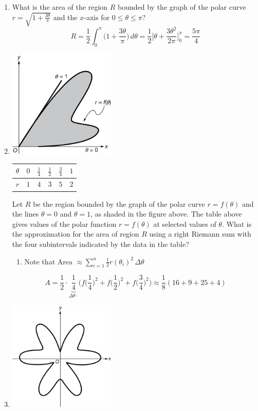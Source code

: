 \documentclass[12pt]{article}
\begin{document}
\begin{enumerate}
	\item What is the area of the region $R$ bounded by the graph of the polar curve $r=\sqrt{1+\frac{3\theta}{\pi}}$ and the $x$-axis for $0\leq\theta\leq\pi$?
	$$R = \frac{1}{2} \int_{0}^{\pi} \bigg(1+\frac{3\theta}{\pi}\bigg) \, d\theta = \frac{1}{2} \bigg[\theta + \frac{3\theta^2}{2\pi}\bigg]_{0}^{\pi} = \boxed{\frac{5\pi}{4}}$$
	\item 
	      \begin{center}
	      	\includegraphics[width = 2in]{7.035}
	      \end{center}
	      \begin{table}[h]
	      	\centering
	      	\begin{tabular}{c|c|c|c|c|c}
	      		$\theta$ & $0$ & $\frac{1}{4}$ & $\frac{1}{2}$ & $\frac{3}{4}$ & $1$ \\ \hline
	      		$r$      & $1$ & $4$           & $3$           & $5$           & $2$ 
	      	\end{tabular}
	      \end{table}
	      Let $R$ be the region bounded by the graph of the polar curve $r=f(\theta)$ and the lines $\theta=0$ and $\theta=1$, as shaded in the figure above. The table above gives values of the polar function $r=f(\theta)$ at selected values of $\theta$. What is the approximation for the area of region $R$ using a right Riemann sum with the four subintervals indicated by the data in the table?
		  \begin{enumerate}
			\item Note that Area $\approx \sum_{i=1}^{n} \frac{1}{2} r(\theta_i)^2 \, \Delta \theta$
		  \end{enumerate}
		  $$A = \frac{1}{2}\cdot \underbrace{\frac{1}{4}}_{\Delta\theta \cdot}\biggr(f\Big(\frac{1}{4}\Big)^2+f\Big(\frac{1}{2}\Big)^2 + f\Big(\frac{3}{4}\Big)^2\biggr) \approx \boxed{\frac{1}{8}(16+9+25+4)}$$
	\item 
	      \begin{center}
	      	\includegraphics[width = 2in]{7.036}

\end{center}
\end{enumerate}
\end{document}
